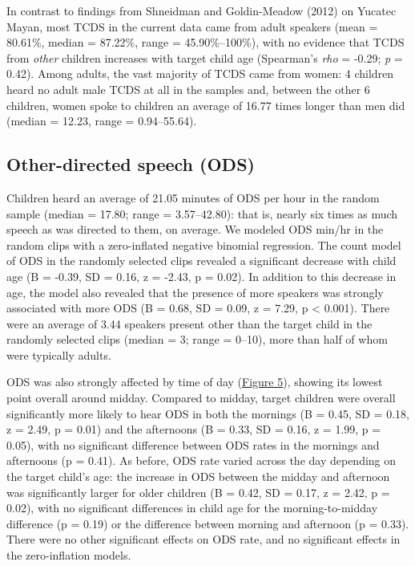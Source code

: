 \documentclass[floatsintext,man]{apa6}
\theoremstyle{definition}
\theoremstyle{definition}
\theoremstyle{definition}
\theoremstyle{remark}
\begin{document}
In contrast to findings from Shneidman and Goldin-Meadow (2012) on
Yucatec Mayan, most TCDS in the current data came from adult speakers
(mean = 80.61\%, median = 87.22\%, range = 45.90\%--100\%), with no
evidence that TCDS from \emph{other} children increases with target
child age (Spearman's \emph{rho} = -0.29; \emph{p} = 0.42). Among
adults, the vast majority of TCDS came from women: 4 children heard no
adult male TCDS at all in the samples and, between the other 6 children,
women spoke to children an average of 16.77 times longer than men did
(median = 12.23, range = 0.94--55.64).

\subsection{Other-directed speech
(ODS)}\label{other-directed-speech-ods}

Children heard an average of 21.05 minutes of ODS per hour in the random
sample (median = 17.80; range = 3.57--42.80): that is, nearly six times
as much speech as was directed to them, on average. We modeled ODS
min/hr in the random clips with a zero-inflated negative binomial
regression. The count model of ODS in the randomly selected clips
revealed a significant decrease with child age (B = -0.39, SD = 0.16, z
= -2.43, p = 0.02). In addition to this decrease in age, the model also
revealed that the presence of more speakers was strongly associated with
more ODS (B = 0.68, SD = 0.09, z = 7.29, p \textless{} 0.001). There
were an average of 3.44 speakers present other than the target child in
the randomly selected clips (median = 3; range = 0--10), more than half
of whom were typically adults.

ODS was also strongly affected by time of day
(\protect\hyperlink{fig5}{Figure 5}), showing its lowest point overall
around midday. Compared to midday, target children were overall
significantly more likely to hear ODS in both the mornings (B = 0.45, SD
= 0.18, z = 2.49, p = 0.01) and the afternoons (B = 0.33, SD = 0.16, z =
1.99, p = 0.05), with no significant difference between ODS rates in the
mornings and afternoons (p = 0.41). As before, ODS rate varied across
the day depending on the target child's age: the increase in ODS between
the midday and afternoon was significantly larger for older children (B
= 0.42, SD = 0.17, z = 2.42, p = 0.02), with no significant differences
in child age for the morning-to-midday difference (p = 0.19) or the
difference between morning and afternoon (p = 0.33). There were no other
significant effects on ODS rate, and no significant effects in the
zero-inflation models.
\end{document}
